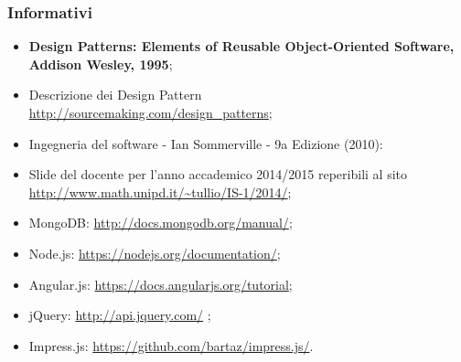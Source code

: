 \subsubsection{Informativi}
\begin{itemize}
\item \textbf{Design Patterns: Elements of Reusable Object-Oriented Software, Addison Wesley, 1995};
\item Descrizione dei Design Pattern\\
\url{http://sourcemaking.com/design_patterns};
\item Ingegneria del software - Ian Sommerville - 9a Edizione (2010):
\item Slide del docente per l'anno accademico 2014/2015 reperibili al sito \\
\url{http://www.math.unipd.it/~tullio/IS-1/2014/};
\item MongoDB: \url{http://docs.mongodb.org/manual/};
\item Node.js: \url{https://nodejs.org/documentation/};
\item Angular.js: \url{https://docs.angularjs.org/tutorial};
\item jQuery: \url{http://api.jquery.com/} ;
\item Impress.js: \url{https://github.com/bartaz/impress.js/}.

\end{itemize}

